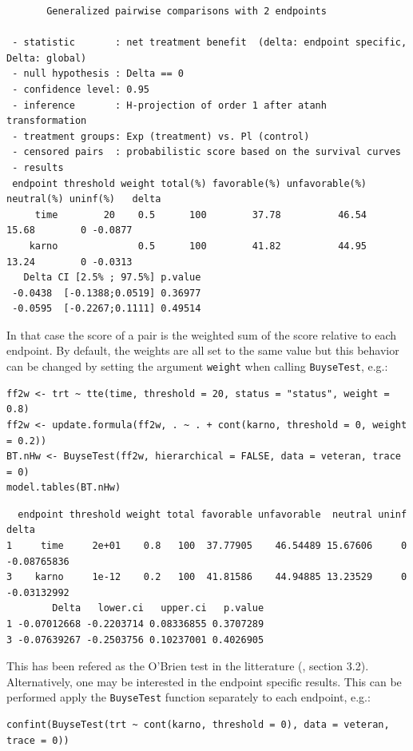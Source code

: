 \documentclass[12pt]{article}
\begin{document}
\begin{verbatim}
       Generalized pairwise comparisons with 2 endpoints

 - statistic       : net treatment benefit  (delta: endpoint specific, Delta: global) 
 - null hypothesis : Delta == 0 
 - confidence level: 0.95 
 - inference       : H-projection of order 1 after atanh transformation 
 - treatment groups: Exp (treatment) vs. Pl (control) 
 - censored pairs  : probabilistic score based on the survival curves
 - results
 endpoint threshold weight total(%) favorable(%) unfavorable(%) neutral(%) uninf(%)   delta
     time        20    0.5      100        37.78          46.54      15.68        0 -0.0877
    karno              0.5      100        41.82          44.95      13.24        0 -0.0313
   Delta CI [2.5% ; 97.5%] p.value 
 -0.0438  [-0.1388;0.0519] 0.36977 
 -0.0595  [-0.2267;0.1111] 0.49514
\end{verbatim}

In that case the score of a pair is the weighted sum of the score
relative to each endpoint. By default, the weights are all set to the
same value but this behavior can be changed by setting the argument
\texttt{weight} when calling \texttt{BuyseTest}, e.g.:
\lstset{language=r,label= ,caption= ,captionpos=b,numbers=none}
\begin{lstlisting}
ff2w <- trt ~ tte(time, threshold = 20, status = "status", weight = 0.8)
ff2w <- update.formula(ff2w, . ~ . + cont(karno, threshold = 0, weight = 0.2))
BT.nHw <- BuyseTest(ff2w, hierarchical = FALSE, data = veteran, trace = 0)
model.tables(BT.nHw)
\end{lstlisting}

\begin{verbatim}
  endpoint threshold weight total favorable unfavorable  neutral uninf       delta
1     time     2e+01    0.8   100  37.77905    46.54489 15.67606     0 -0.08765836
3    karno     1e-12    0.2   100  41.81586    44.94885 13.23529     0 -0.03132992
        Delta   lower.ci   upper.ci   p.value
1 -0.07012668 -0.2203714 0.08336855 0.3707289
3 -0.07639267 -0.2503756 0.10237001 0.4026905
\end{verbatim}


This has been refered as the O’Brien test in the litterature
(\cite{verbeeck2019generalized}, section 3.2). Alternatively, one may be
interested in the endpoint specific results. This can be performed
apply the \texttt{BuyseTest} function separately to each endpoint, e.g.:
\lstset{language=r,label= ,caption= ,captionpos=b,numbers=none}
\begin{lstlisting}
confint(BuyseTest(trt ~ cont(karno, threshold = 0), data = veteran, trace = 0))
\end{lstlisting}
\end{document}
